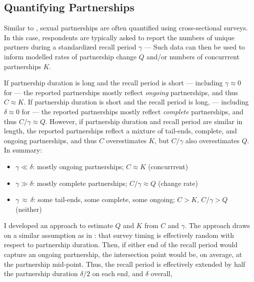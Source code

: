 \subsection{Quantifying Partnerships}\label{app.math.dur.qp}
Similar to ,
sexual partnerships are often quantified using cross-sectional surveys.
In this case, respondents are typically asked to report the numbers of unique partners
during a standardized recall period $\gamma$ --- \eg
{}
Such data can then be used to inform modelled
rates of partnership change $Q$ and/or numbers of concurrrent partnerships $K$.
\par
If partnership duration is long and the recall period is short
--- including $\gamma \approx 0$ for
 ---
the reported partnerships mostly reflect \emph{ongoing} partnerships,
and thus $C \approx K$.
If partnership duration is short and the recall period is long,
--- including $\delta \approx 0$ for
 ---
the reported partnerships mostly reflect \emph{complete} partnerships,
and thus $C/\gamma \approx Q$.
However, if partnership duration and recall period are similar in length,
the reported partnerships reflect a mixture of tail-ends, complete, and ongoing partnerships,
and thus $C$ overestimates $K$, but $C/\gamma$ also overestimates $Q$.
In summary:
\begin{itemize}
  \item $\gamma \ll \delta$: mostly ongoing partnerships;
  $C \approx K$ (concurrrent)
  \item $\gamma \gg \delta$: mostly complete partnerships;
  $C/\gamma \approx Q$ (change rate)
  \item $\gamma\,\approx\,\delta$: some tail-ends, some complete, some ongoing;
  $C > K$, $C/\gamma > Q$ (neither)
\end{itemize}
\par
I developed an approach to estimate $Q$ and $K$ from $C$ and $\gamma$.
The approach draws on a similar assumption as in :
that survey timing is effectively random with respect to partnership duration.
Then, if either end of the recall period would capture an ongoing partnership,
the intersection point would be, on average, at the partnership mid-point.
Thus, the recall period is effectively extended
by half the partnership duration $\delta/2$ on each end, and $\delta$ overall,
